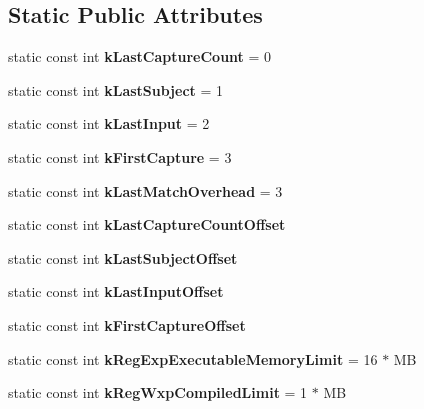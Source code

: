 \subsection*{Static Public Attributes}
\begin{DoxyCompactItemize}
\item 
\hypertarget{classv8_1_1internal_1_1_reg_exp_impl_a0ebdcb279e7c56f30c397ba84dd25833}{}static const int {\bfseries k\+Last\+Capture\+Count} = 0\label{classv8_1_1internal_1_1_reg_exp_impl_a0ebdcb279e7c56f30c397ba84dd25833}

\item 
\hypertarget{classv8_1_1internal_1_1_reg_exp_impl_af0bb70863d5995ff8b58fdae9fbcf7fe}{}static const int {\bfseries k\+Last\+Subject} = 1\label{classv8_1_1internal_1_1_reg_exp_impl_af0bb70863d5995ff8b58fdae9fbcf7fe}

\item 
\hypertarget{classv8_1_1internal_1_1_reg_exp_impl_a938ab5e472e920331c8be2ba9096bf0d}{}static const int {\bfseries k\+Last\+Input} = 2\label{classv8_1_1internal_1_1_reg_exp_impl_a938ab5e472e920331c8be2ba9096bf0d}

\item 
\hypertarget{classv8_1_1internal_1_1_reg_exp_impl_aef40942dc86416fc05927c875c5339dd}{}static const int {\bfseries k\+First\+Capture} = 3\label{classv8_1_1internal_1_1_reg_exp_impl_aef40942dc86416fc05927c875c5339dd}

\item 
\hypertarget{classv8_1_1internal_1_1_reg_exp_impl_a4fe094990a563f4b6cf3e54eaaa11302}{}static const int {\bfseries k\+Last\+Match\+Overhead} = 3\label{classv8_1_1internal_1_1_reg_exp_impl_a4fe094990a563f4b6cf3e54eaaa11302}

\item 
static const int {\bfseries k\+Last\+Capture\+Count\+Offset}
\item 
static const int {\bfseries k\+Last\+Subject\+Offset}
\item 
static const int {\bfseries k\+Last\+Input\+Offset}
\item 
static const int {\bfseries k\+First\+Capture\+Offset}
\item 
\hypertarget{classv8_1_1internal_1_1_reg_exp_impl_a8a35e37765c28a6f65ad7deed00e45bf}{}static const int {\bfseries k\+Reg\+Exp\+Executable\+Memory\+Limit} = 16 $\ast$ M\+B\label{classv8_1_1internal_1_1_reg_exp_impl_a8a35e37765c28a6f65ad7deed00e45bf}

\item 
\hypertarget{classv8_1_1internal_1_1_reg_exp_impl_a0414d5e358971dafe7c362d70b3b8428}{}static const int {\bfseries k\+Reg\+Wxp\+Compiled\+Limit} = 1 $\ast$ M\+B\label{classv8_1_1internal_1_1_reg_exp_impl_a0414d5e358971dafe7c362d70b3b8428}

\end{DoxyCompactItemize}


